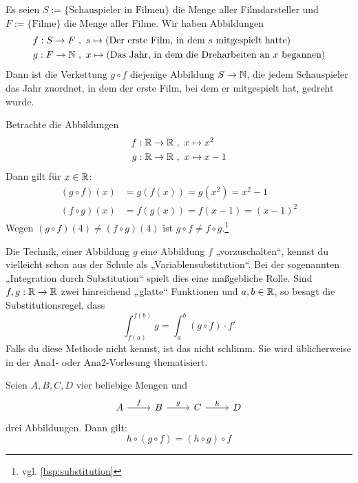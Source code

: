 \begin{bsp}
    Es seien $S:= \{ \text{Schauspieler in Filmen}\}$ die Menge aller Filmdarsteller und $F:=\{\text{Filme}\}$ die Menge aller Filme. Wir haben Abbildungen
    \begin{align*}
        f : S \to F \ & ,\ s\mapsto (\text{Der erste Film, in dem $s$ mitgespielt hatte}) \\
        g : F \to \mathbb N \ & ,\ x \mapsto (\text{Das Jahr, in dem die Dreharbeiten an $x$ begannen})
    \end{align*}
    Dann ist die Verkettung $g\circ f$ diejenige Abbildung $S\to \mathbb N$, die jedem Schauspieler das Jahr zuordnet, in dem der erste Film, bei dem er mitgespielt hat, gedreht wurde.
\end{bsp}


\begin{bsp} \label{bsp:verkettung}
    Betrachte die Abbildungen
    \begin{align*}
        f : \mathbb R \to \mathbb R \ &,\ x\mapsto x^2 \\
        g : \mathbb R \to \mathbb R \ &,\ x \mapsto x-1
    \end{align*}
    Dann gilt für $x\in \mathbb R$:
    \begin{align*}
        (g\circ f)(x) & = g(f(x)) = g(x^2) = x^2-1 \\
        (f\circ g)(x) & = f(g(x)) = f(x-1) = (x-1)^2
    \end{align*}
    Wegen $(g\circ f)(4)\neq (f\circ g)(4)$ ist $g\circ f\neq f\circ g$.\footnote{vgl. \cref{bsp:substitution}}
\end{bsp}


\begin{vorschau}
    Die Technik, einer Abbildung $g$ eine Abbildung $f$ „vorzuschalten“, kennst du vielleicht schon aus der Schule als „Variablensubstitution“. Bei der sogenannten „Integration durch Substitution“ spielt dies eine maßgebliche Rolle. Sind $f,g:\mathbb R\to \mathbb R$ zwei hinreichend „glatte“ Funktionen und $a,b\in \mathbb R$, so besagt die Substitutionsregel, dass
        \[ \int_{f(a)}^{f(b)} g = \int_a^b (g\circ f) \cdot f' \]
    Falls du diese Methode nicht kennst, ist das nicht schlimm. Sie wird üblicherweise in der Ana1- oder Ana2-Vorlesung thematisiert.
\end{vorschau}


\begin{satz} \label{abbassoziativ}
    Seien $A,B,C,D$ vier beliebige Mengen und
    \[\begin{tikzcd}
        A \ar[r, "f"] & B \ar[r, "g"] & C \ar[r, "h"] & D
    \end{tikzcd}\]
    drei Abbildungen. Dann gilt:
        \[ h\circ (g\circ f) = (h\circ g)\circ f\]
\end{satz}


